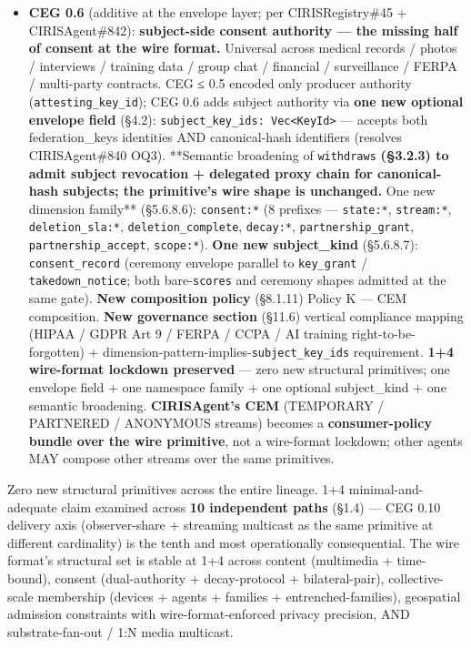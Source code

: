 \documentclass[10pt]{article}
\begin{document}
\begin{itemize}
\item \textbf{CEG 0.6} (additive at the envelope layer; per CIRISRegistry\#45 + CIRISAgent\#842): \textbf{subject-side consent authority — the missing half of consent at the wire format.} Universal across medical records / photos / interviews / training data / group chat / financial / surveillance / FERPA / multi-party contracts. CEG ≤ 0.5 encoded only producer authority (\texttt{attesting\_key\_id}); CEG 0.6 adds subject authority via \textbf{one new optional envelope field} (§4.2): \texttt{subject\_key\_ids: Vec<KeyId>} — accepts both federation\_keys identities AND canonical-hash identifiers (resolves CIRISAgent\#840 OQ3). **Semantic broadening of \texttt{withdraws}\textbf{ (§3.2.3) to admit subject revocation + delegated proxy chain for canonical-hash subjects; the primitive's wire shape is unchanged. }One new dimension family** (§5.6.8.6): \texttt{consent:*} (8 prefixes — \texttt{state:*}, \texttt{stream:*}, \texttt{deletion\_sla:*}, \texttt{deletion\_complete}, \texttt{decay:*}, \texttt{partnership\_grant}, \texttt{partnership\_accept}, \texttt{scope:*}). \textbf{One new subject\_kind} (§5.6.8.7): \texttt{consent\_record} (ceremony envelope parallel to \texttt{key\_grant} / \texttt{takedown\_notice}; both bare-\texttt{scores} and ceremony shapes admitted at the same gate). \textbf{New composition policy} (§8.1.11) Policy K — CEM composition. \textbf{New governance section} (§11.6) vertical compliance mapping (HIPAA / GDPR Art 9 / FERPA / CCPA / AI training right-to-be-forgotten) + dimension-pattern-implies-\texttt{subject\_key\_ids} requirement. \textbf{1+4 wire-format lockdown preserved} — zero new structural primitives; one envelope field + one namespace family + one optional subject\_kind + one semantic broadening. \textbf{CIRISAgent's CEM} (TEMPORARY / PARTNERED / ANONYMOUS streams) becomes a \textbf{consumer-policy bundle over the wire primitive}, not a wire-format lockdown; other agents MAY compose other streams over the same primitives.
\end{itemize}


Zero new structural primitives across the entire lineage. 1+4 minimal-and-adequate claim examined across \textbf{10 independent paths} (§1.4) — CEG 0.10 delivery axis (observer-share + streaming multicast as the same primitive at different cardinality) is the tenth and most operationally consequential. The wire format's structural set is stable at 1+4 across content (multimedia + time-bound), consent (dual-authority + decay-protocol + bilateral-pair), collective-scale membership (devices + agents + families + entrenched-families), geospatial admission constraints with wire-format-enforced privacy precision, AND substrate-fan-out / 1:N media multicast.
\end{document}
